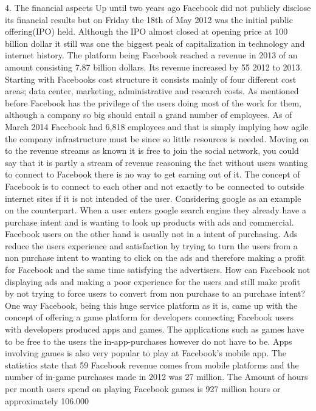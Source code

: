\documentclass[conference]{IEEEtran}
\begin{document}
4. The financial aspects
Up until two years ago Facebook did not publicly disclose its ﬁnancial
results but on Friday the 18th of May 2012 was the initial public offering(IPO)
held. Although the IPO almost closed at opening price at 100 billion dollar it
still was one the biggest peak of capitalization in technology and internet
history. The platform being Facebook reached a revenue in 2013 of an amount
consisting 7.87 billion dollars. Its revenue increased by 55%
2012 to 2013. 
Starting with Facebooks cost structure it consists mainly of four different
cost areas; data center, marketing, administrative and research costs. As
mentioned before Facebook has the privilege of the users doing most of the work
for them, although a company so big should entail a grand number of employees.
As of March 2014 Facebook had 6,818 employees and that is simply implying how
agile the company infrastructure must be since so little resources is needed. 
Moving on to the revenue streams as known it is free to join the social
network, you could say that it is partly a stream of revenue reasoning the fact
without users wanting to connect to Facebook there is no way to get earning out
of it. The concept of Facebook is to connect to each other and not exactly to
be connected to outside internet sites if it is not intended of the user.
Considering google as an example on the counterpart. When a user enters google
search engine they already have a purchase intent and is wanting to look up
products with ads and commercial. Facebook users on the other hand is usually
not in a intent of purchasing. Ads reduce the users experience and satisfaction
by trying to turn the users from a non purchase intent to wanting to click on
the ads and therefore making a profit for Facebook and the same time satisfying
the advertisers. How can Facebook not displaying ads and making a poor
experience for the users and still make profit by not trying to force users to
convert from non purchase to an purchase intent? One way Facebook, being this
huge service platform as it is, came up with the concept of offering a game
platform for developers connecting Facebook users with developers produced apps
and games. The applications such as games have to be free to the users the
in-app-purchases however do not have to be. Apps involving games is also very
popular to play at Facebook's mobile app. The statistics state that 59%
Facebook revenue comes from mobile platforms and the number of in-game
purchases made in 2012 was 27 million. The Amount of hours per month users
spend on playing Facebook games is 927 million hours or approximately 106.000
\end{document}
